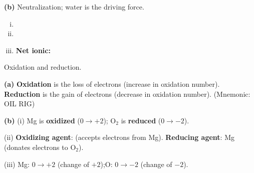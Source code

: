 \documentclass[addpoints]{exam}
\begin{document}
\begin{questions}
\begin{solution}[10cm]
\textbf{(b)} Neutralization; water is the driving force.
\begin{enumerate}[(i)]
\item {}
\item {}
\item \textbf{Net ionic:} 
\end{enumerate}
\end{solution}

\question Oxidation and reduction.
\begin{solution}[7cm]
\textbf{(a)} \textbf{Oxidation} is the loss of electrons (increase in oxidation number).
\textbf{Reduction} is the gain of electrons (decrease in oxidation number).
(Mnemonic: OIL RIG)

\textbf{(b)}
(i) Mg is \textbf{oxidized} ($0 \to +2$); O$_2$ is \textbf{reduced} ($0 \to -2$).

(ii) \textbf{Oxidizing agent}:  (accepts electrons from Mg).
\textbf{Reducing agent}: Mg (donates electrons to O$_2$).

(iii) Mg: $0 \to +2$ (change of $+2$);\quad O: $0 \to -2$ (change of $-2$).
\end{solution}

\end{questions}
\end{document}

